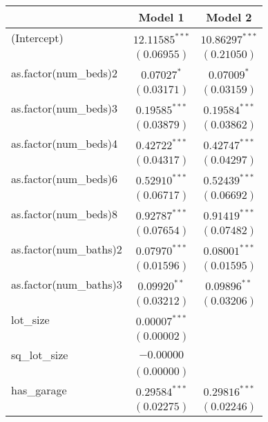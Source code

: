 
\begin{table}
\begin{center}
\begin{tabular}{l c c}
\hline
 & Model 1 & Model 2 \\
\hline
(Intercept)                & $12.11585^{***}$ & $10.86297^{***}$ \\
                           & $(0.06955)$      & $(0.21050)$      \\
as.factor(num\_beds)2      & $0.07027^{*}$    & $0.07009^{*}$    \\
                           & $(0.03171)$      & $(0.03159)$      \\
as.factor(num\_beds)3      & $0.19585^{***}$  & $0.19584^{***}$  \\
                           & $(0.03879)$      & $(0.03862)$      \\
as.factor(num\_beds)4      & $0.42722^{***}$  & $0.42747^{***}$  \\
                           & $(0.04317)$      & $(0.04297)$      \\
as.factor(num\_beds)6      & $0.52910^{***}$  & $0.52439^{***}$  \\
                           & $(0.06717)$      & $(0.06692)$      \\
as.factor(num\_beds)8      & $0.92787^{***}$  & $0.91419^{***}$  \\
                           & $(0.07654)$      & $(0.07482)$      \\
as.factor(num\_baths)2     & $0.07970^{***}$  & $0.08001^{***}$  \\
                           & $(0.01596)$      & $(0.01595)$      \\
as.factor(num\_baths)3     & $0.09920^{**}$   & $0.09896^{**}$   \\
                           & $(0.03212)$      & $(0.03206)$      \\
lot\_size                  & $0.00007^{***}$  &                  \\
                           & $(0.00002)$      &                  \\
sq\_lot\_size              & $-0.00000$       &                  \\
                           & $(0.00000)$      &                  \\
has\_garage                & $0.29584^{***}$  & $0.29816^{***}$  \\
                           & $(0.02275)$      & $(0.02246)$      \\

\end{tabular}
\end{center}
\end{table}
